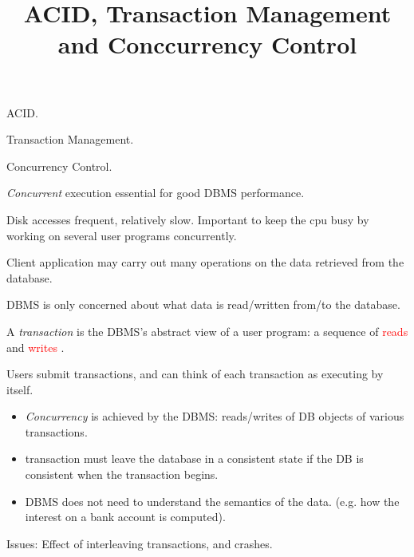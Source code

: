 \documentclass{beamer}
\title{ACID, Transaction Management and Conccurrency Control }
\author{ }
\institute{Hogeschool Rotterdam \\ 
Rotterdam, Netherlands}
\date{}
\newcommand{\red}[1]{
\textcolor{red}{#1}
}
\begin{document}
\maketitle

\begin{slide}{
\item ACID.
\item Transaction Management.
\item Concurrency Control.
}\end{slide}

\begin{slide}{
\item \emph{Concurrent} execution essential for good DBMS performance.
\item Disk accesses frequent, relatively slow. Important to keep the cpu busy by working on several user programs concurrently.
\item Client application may carry out many operations on the data retrieved from the database.
\item DBMS is only concerned about what data is read/written from/to the database.
\pause
\item A \textit{transaction} is the DBMS’s abstract view of a user program:  a sequence of \red{reads} and \red{writes}.
}\end{slide}


\begin{slide}{
\item Users submit transactions, and can think of each transaction as executing by itself.
\begin{itemize}
	\item \emph{Concurrency} is achieved by the DBMS: reads/writes of DB objects of various transactions.
	\item transaction must leave the database in a consistent state if the DB is consistent when the transaction begins.
	\item DBMS does not need to understand the semantics of the data.  (e.g. how the interest on a bank account is computed).	
\end{itemize}
\item Issues:  Effect of interleaving transactions, and crashes.
}\end{slide}
\end{document}
